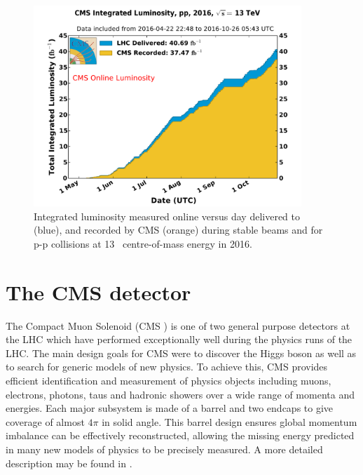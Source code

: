 \begin{figure}
\centering
    \includegraphics[width=0.9\textwidth]{./Figures/detector/int_lumi_per_day_cumulative_pp_2016OnlineLumi}
  \caption{Integrated luminosity measured online versus day delivered to (blue), 
  and recorded by CMS (orange) during stable beams and for p-p collisions at 13\TeV~ centre-of-mass energy in 2016.}
  \label{fig:LHC-integrated-lumi}
\end{figure}

\section{The CMS detector}
The Compact Muon Solenoid (CMS \cite{CMS}) is one of two general purpose detectors at the LHC 
which have performed exceptionally well during the physics runs of the LHC. The main design goals
for CMS were to discover the Higgs boson as well as to search for generic models 
of new physics. To achieve this, CMS provides efficient identification and measurement
of physics objects including muons, electrons, photons, taus and hadronic showers over a
wide range of momenta and energies. Each major subsystem is made of a barrel
and two endcaps to give coverage of almost $4\pi$ in solid angle. 
This barrel design ensures global momentum imbalance can be effectively 
reconstructed, allowing the missing energy predicted in many new models of physics to be
precisely measured. A more detailed description may be found in \cite{CMS}.  


